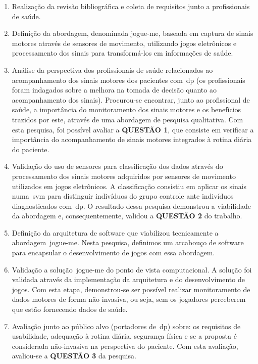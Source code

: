 \begin{enumerate}

\item{Realização da revisão bibliográfica e coleta de requisitos junto a profissionais de saúde.}

\item{Definição da abordagem, denominada \ac{jogue-me}, baseada em captura de sinais motores através de sensores de movimento, utilizando jogos eletrônicos e processamento dos sinais para transformá-los em informações de saúde.}


\item{Análise da perspectiva dos profissionais de saúde relacionados ao acompanhamento dos sinais motores dos pacientes com~\ac{dp} (os profissionais foram indagados sobre a melhora na tomada de decisão quanto ao acompanhamento dos sinais). Procurou-se encontrar, junto ao profissional de saúde, a importância do monitoramento dos sinais motores e os benefícios trazidos por este, através de uma abordagem de pesquisa qualitativa. Com esta pesquisa, foi possível avaliar a \textbf{QUESTÃO 1}, que consiste em verificar a importância do acompanhamento de sinais motores integrados à rotina diária do paciente.}

\item{Validação do uso de sensores para classificação dos dados através do processamento dos sinais motores adquiridos por sensores de movimento utilizados em jogos eletrônicos. A classificação consistiu em aplicar os sinais numa~\ac{svm} para distinguir indivíduos do grupo controle ante indivíduos diagnosticados com~\ac{dp}.
O resultado dessa pesquisa demonstrou a viabilidade da abordagem e, consequentemente, validou a \textbf{QUESTÃO 2} do trabalho.}

\item{Definição da arquitetura de software que viabilizou tecnicamente a abordagem~\ac{jogue-me}. Nesta pesquisa, definimos um arcabouço de software para encapsular o desenvolvimento de jogos com essa abordagem.}

\item{Validação a solução~\ac{jogue-me} do ponto de vista computacional. A solução foi validada através da implementação da arquitetura e do desenvolvimento de jogos. Com esta etapa, demonstrou-se ser possível realizar monitoramento de dados motores de forma não invasiva, ou seja, sem os jogadores perceberem que estão fornecendo dados de saúde.}

\item{Avaliação junto ao público alvo (portadores de~\ac{dp}) sobre: os requisitos de usabilidade, adequação à rotina diária, segurança física e se a proposta é considerada não-invasiva na perspectiva do paciente. Com esta avaliação, avaliou-se a \textbf{QUESTÃO 3} da pesquisa.}

\end{enumerate}


